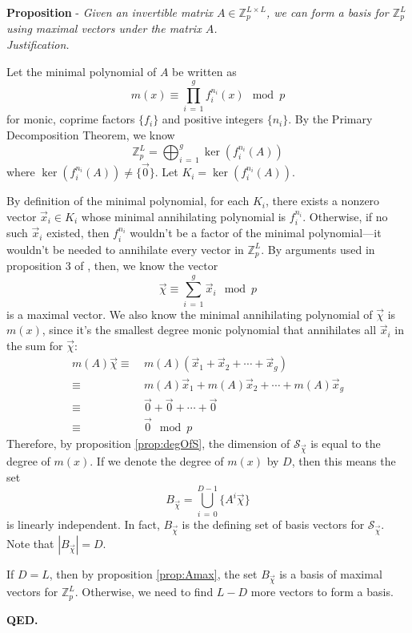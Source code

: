 \documentclass[a4paper, 12pt, reqno]{amsart}
\newcounter{propcounter}
\newenvironment{proposition}[1]
{
	\refstepcounter{propcounter}
	\textbf{Proposition \thepropcounter} - \emph{#1} \\
	\emph{Justification.}
}
{
	\textbf{QED.} \\
}
\begin{document}
		\begin{proposition}{Given an invertible matrix $A \in \mathds{Z}_p^{L \times L}$, we can form a basis for $\mathds{Z}_p^L$ using maximal vectors under the matrix 
		$A$.}
			\label{prop:maxBasis}
			Let the minimal polynomial of $A$ be written as
			\[
				m(x) \equiv \prod_{i\,=\,1}^g f_i^{n_i}(x) \mod{p}
			\]
			for monic, coprime factors $\{f_i\}$ and positive integers $\{n_i\}$. By the Primary Decomposition Theorem, we know
			\[
				\mathds{Z}_p^L = \bigoplus_{i\,=\,1}^g \ker{(f_i^{n_i}(A))}
			\]
			where $\ker{(f_i^{n_i}(A))} \neq \{\vec{0}\}$. Let $K_i = \ker{(f_i^{n_i}(A))}$.
			
			By definition of the minimal polynomial, for each $K_i$, there exists a nonzero vector $\vec{x}_i \in K_i$ whose minimal annihilating polynomial is $f_i^{n_i}$. 
			Otherwise, if no such $\vec{x}_i$ existed, then $f_i^{n_i}$ wouldn't be a factor of the minimal polynomial---it wouldn't be needed to annihilate every vector in
			$\mathds{Z}_p^L$. By arguments used in proposition 3 of \citet{Mendivil2012}, then, we know the vector 
			\[
				\vec{\chi} \equiv \sum_{i\,=\,1}^g \vec{x}_i \mod{p}
			\]
			is a maximal vector. We also know the minimal annihilating polynomial of $\vec{\chi}$ is $m(x)$, since it's the smallest degree monic polynomial that annihilates 
			all $\vec{x}_i$ in the sum for $\vec{\chi}$:
			\begin{align*}
				m(A)\vec{\chi} \equiv& \ m(A)(\vec{x}_1 + \vec{x}_2 + \cdots + \vec{x}_g)       \\
				               \equiv& \ m(A)\vec{x}_1 + m(A)\vec{x}_2 + \cdots + m(A)\vec{x}_g \\
							   \equiv& \ \vec{0} + \vec{0} + \cdots + \vec{0}                   \\
							   \equiv& \ \vec{0} \mod{p}
			\end{align*}
			Therefore, by proposition \ref{prop:degOfS}, the dimension of $\mathcal{S}_{\vec{\chi}}$ is equal to the degree of $m(x)$. If we denote the degree of $m(x)$ by 
			$D$, then this means the set
			\[
				B_{\vec{\chi}} = \bigcup_{i\,=\,0}^{D-1} \{A^i\vec{\chi}\}
			\]
			is linearly independent. In fact, $B_{\vec{\chi}}$ is the defining set of basis vectors for $\mathcal{S}_{\vec{\chi}}$. Note that $|B_{\vec{\chi}}| = D$.
			
			If $D = L$, then by proposition \ref{prop:Amax}, the set $B_{\vec{\chi}}$ is a basis of maximal vectors for $\mathds{Z}_p^L$. Otherwise, we need to find $L-D$ 
			more vectors to form a basis. 
			

\end{proposition}
\end{document}
